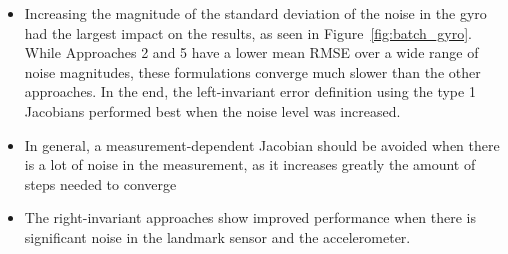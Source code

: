 \begin{itemize}
	\item Increasing the magnitude of the standard deviation of the noise in the gyro had the largest impact on the results, as seen in Figure~\ref{fig:batch_gyro}. While Approaches 2 and 5 have a lower mean RMSE over a wide range of noise magnitudes, these formulations converge much slower than the other approaches. In the end, the left-invariant error definition using the type 1 Jacobians performed best when the noise level was increased.
	\item In general, a measurement-dependent Jacobian should be avoided when there is a lot of noise in the measurement, as it increases greatly the amount of steps needed to converge
	\item The right-invariant approaches show improved performance when there is significant noise in the landmark sensor and the accelerometer.
\end{itemize}

